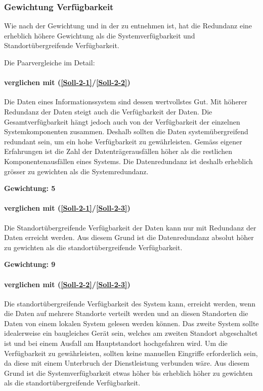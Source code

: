 \subsubsection*{Gewichtung Verfügbarkeit}

Wie nach der Gewichtung und in der  zu entnehmen ist, hat die Redundanz eine erheblich höhere Gewichtung als die Systemverfügbarkeit und Standortübergreifende Verfügbarkeit.

Die Paarvergleiche im Detail:

\paragraph*{ verglichen mit  (\ref{Soll-2-1}/\ref{Soll-2-2})}
Die Daten eines Informationssystem sind dessen wertvollstes Gut. Mit höherer Redundanz der Daten steigt auch die Verfügbarkeit der Daten.
Die Gesamtverfügbarkeit hängt jedoch auch von der Verfügbarkeit der einzelnen Systemkomponenten zusammen. Deshalb sollten die Daten systemübergreifend redundant sein, um ein hohe Verfügbarkeit zu gewährleisten. Gemäss eigener Erfahrungen ist die Zahl der Datenträgerausfällen höher als die restlichen Komponentenausfällen eines Systems. Die Datenredundanz ist deshalb erheblich grösser zu gewichten als die Systemredundanz.

\textbf{Gewichtung: 5}

\paragraph*{ verglichen mit  (\ref{Soll-2-1}/\ref{Soll-2-3})}
Die Standortübergreifende Verfügbarkeit der Daten kann nur mit Redundanz der Daten erreicht werden. Aus diesem Grund ist die Datenredundanz absolut höher zu gewichten als die standortübergreifende Verfügbarkeit.

\textbf{Gewichtung: 9}

\paragraph*{ verglichen mit  (\ref{Soll-2-2}/\ref{Soll-2-3})}
Die standortübergreifende Verfügbarkeit des System kann, erreicht werden, wenn die Daten auf mehrere Standorte verteilt werden und an diesen Standorten die Daten von einem lokalen System gelesen werden können. Das zweite System sollte idealerweise ein baugleiches Gerät sein, welches am zweiten Standort abgeschaltet ist und bei einem Ausfall am Hauptstandort hochgefahren wird.
Um die Verfügbarkeit zu gewährleisten, sollten keine manuellen Eingriffe erforderlich sein, da diese mit einem Unterbruch der Dienstleistung verbunden wäre. Aus diesem Grund ist die Systemverfügbarkeit etwas höher bis erheblich höher zu gewichten als die standortübergreifende Verfügbarkeit.


